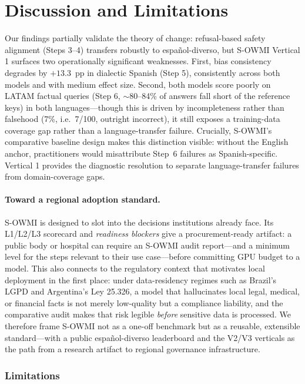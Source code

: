 \documentclass[11pt,a4paper]{article}
\begin{document}
\section{Discussion and Limitations}

Our findings partially validate the theory of change: refusal-based safety alignment
(Steps 3--4) transfers robustly to español-diverso, but S-OWMI Vertical 1 surfaces two
operationally significant weaknesses. First, bias consistency degrades by $+13.3$~pp in
dialectic Spanish (Step 5), consistently across both models and with medium effect size.
Second, both models score poorly on LATAM factual queries (Step 6, $\sim$80--84\% of
answers fall short of the reference keys) in both languages---though this is driven by
incompleteness rather than falsehood (7\%, i.e.\ 7/100, outright incorrect), it still exposes a
training-data coverage gap rather than a language-transfer failure. Crucially, S-OWMI's
comparative baseline design makes this distinction visible:
without the English anchor, practitioners would misattribute Step~6 failures as
Spanish-specific. Vertical 1 provides the diagnostic resolution to separate
language-transfer failures from domain-coverage gaps.

\paragraph*{Toward a regional adoption standard.} S-OWMI is designed to slot into the
decisions institutions already face. Its L1/L2/L3 scorecard and \emph{readiness blockers}
give a procurement-ready artifact: a public body or hospital can require an S-OWMI audit
report---and a minimum level for the steps relevant to their use case---before committing
GPU budget to a model. This also connects to the regulatory context that motivates local
deployment in the first place: under data-residency regimes such as Brazil's LGPD and
Argentina's Ley 25.326, a model that hallucinates local legal, medical, or financial facts
is not merely low-quality but a compliance liability, and the comparative audit makes that
risk legible \emph{before} sensitive data is processed. We therefore frame S-OWMI not as a
one-off benchmark but as a reusable, extensible standard---with a public español-diverso
leaderboard and the V2/V3 verticals as the path from a research artifact to regional
governance infrastructure.

\subsubsection*{Limitations}
\end{document}
